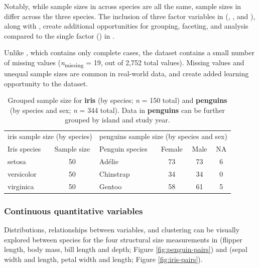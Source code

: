 Notably, while sample sizes in  across species are all the
same, sample sizes in  differ across the three species.
The inclusion of three factor variables in 
(, , and ), along with ,
create additional opportunities for grouping, faceting, and analysis
compared to the single factor () in .

Unlike , which contains only complete cases, the
 dataset contains a small number of missing values
(\emph{n}\textsubscript{missing} = 19, out of 2,752 total values).
Missing values and unequal sample sizes are common in real-world data,
and create added learning opportunity to the  dataset.

\begin{Schunk}
\begin{table}

\caption{\label{tab:unnamed-chunk-6}Grouped sample size for \textbf{iris} (by species; \textit{n} = 150 total) and \textbf{penguins} (by species and sex; \textit{n} = 344 total). Data in \textbf{penguins} can be further grouped by island and study year.}
\centering
\begin{tabular}[t]{lclccc}
\toprule
\multicolumn{2}{c}{iris sample size (by species)} & \multicolumn{4}{c}{penguins sample size (by species and sex)} \\
\cmidrule(l{3pt}r{3pt}){1-2} \cmidrule(l{3pt}r{3pt}){3-6}
Iris species & Sample size & Penguin species & Female & Male & NA\\
\midrule
setosa & 50 & Adélie & 73 & 73 & 6\\
versicolor & 50 & Chinstrap & 34 & 34 & 0\\
virginica & 50 & Gentoo & 58 & 61 & 5\\
\bottomrule
\end{tabular}
\end{table}

\end{Schunk}

\hypertarget{continuous-quantitative-variables}{%
\subsubsection{Continuous quantitative
variables}\label{continuous-quantitative-variables}}

Distributions, relationships between variables, and clustering can be
visually explored between species for the four structural size
measurements in  (flipper length, body mass, bill length
and depth; Figure \ref{fig:penguin-pairs}) and  (sepal width
and length, petal width and length; Figure \ref{fig:iris-pairs}).

